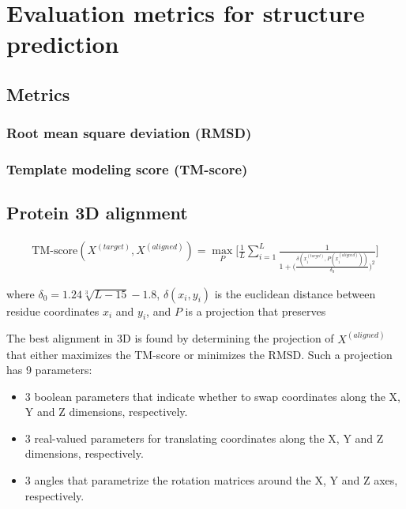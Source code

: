 \chapter{Evaluation metrics for structure prediction} \label{metrics3d}

  \section{Metrics}

    \subsection{Root mean square deviation (RMSD)}

      \todo{}

    \subsection{Template modeling score (TM-score)}

      \todo{}

  \section{Protein 3D alignment}

    \begin{align}
        \text{TM-score}(X^{(target)}, X^{(aligned)}) = \max_P \Bigg[ \frac{1}{L} \sum\limits_{i=1}^L
            \frac{1}{1 + \Big(\frac{\delta(x_i^{(target)}, P(x_i^{(aligned)}))}{\delta_0}\Big)^2} \Bigg]
    \end{align}

    where $\delta_0 = 1.24 \sqrt[3]{L - 15} - 1.8$, $\delta(x_i, y_i)$ is the euclidean distance
    between residue coordinates $x_i$ and $y_i$, and $P$ is a projection that preserves

    The best alignment in 3D is found by determining the projection of $X^{(aligned)}$ that
    either maximizes the TM-score or minimizes the RMSD.
    Such a projection has 9 parameters:
    \begin{itemize}
        \item 3 boolean parameters that indicate whether to swap coordinates along
        the X, Y and Z dimensions, respectively.
        \item 3 real-valued parameters for translating coordinates along the X, Y and Z
        dimensions, respectively.
        \item 3 angles that parametrize the rotation matrices around the X, Y and Z axes,
        respectively.
    \end{itemize}

